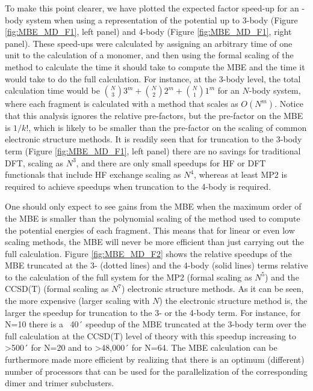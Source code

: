\documentclass[11pt, proquest]{uwthesis}[2020/02/24]
\begin{document}
\par To make this point clearer, we have plotted the expected factor speed-up for an -body system when using a representation of the potential up to 3-body (Figure \ref{fig:MBE_MD_F1}, left panel) and 4-body (Figure \ref{fig:MBE_MD_F1}, right panel). These speed-ups were calculated by assigning an arbitrary time of one unit to the calculation of a monomer, and then using the formal scaling of the method to calculate the time it should take to compute the MBE and the time it would take to do the full calculation. For instance, at the 3-body level, the total calculation time would be $\binom{N}{3}3^m+\binom{N}{2}2^m+\binom{N}{1}1^m$ for an $N$-body system, where each fragment is calculated with a method that scales as $O(N^m)$. Notice that this analysis ignores the relative pre-factors, but the pre-factor on the MBE is $1/k!$, which is likely to be smaller than the pre-factor on the scaling of common electronic structure methods. It is readily seen that for truncation to the 3-body term (Figure \ref{fig:MBE_MD_F1}, left panel) there are no savings for traditional DFT, scaling as $N^3$, and there are only small speedups for HF or DFT functionals that include HF exchange scaling as $N^4$, whereas at least MP2 is required to achieve speedups when truncation to the 4-body is required.

\par One should only expect to see gains from the MBE when the maximum order of the MBE is smaller than the polynomial scaling of the method used to compute the potential energies of each fragment. This means that for linear or even low scaling methods, the MBE will never be more efficient than just carrying out the full calculation. Figure \ref{fig:MBE_MD_F2} shows the relative speedups of the MBE truncated at the 3- (dotted lines) and the 4-body (solid lines) terms relative to the calculation of the full system for the MP2 (formal scaling as $N^5$) and the CCSD(T) (formal scaling as $N^7$) electronic structure methods. As it can be seen, the more expensive (larger scaling with $N$) the electronic structure method is, the larger the speedup for truncation to the 3- or the 4-body term. For instance, for N=10 there is a ~40´ speedup of the MBE truncated at the 3-body term over the full calculation at the CCSD(T) level of theory with this speedup increasing to >500´ for N=20 and to >48,000´ for N=64. The MBE calculation can be furthermore made more efficient by realizing that there is an optimum (different) number of processors that can be used for the parallelization of the corresponding dimer and trimer subclusters.
\end{document}
